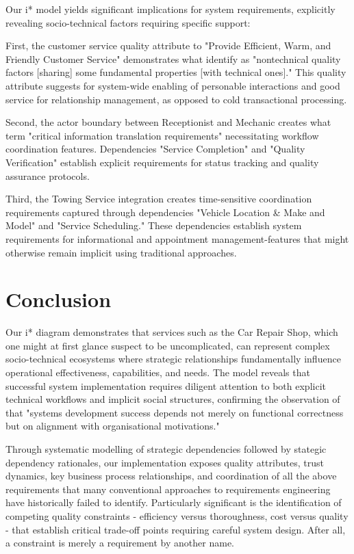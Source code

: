 \documentclass[14pt,a4paper]{article}
\begin{document}
Our i* model yields significant implications for system requirements, explicitly revealing socio-technical factors requiring specific support:

First, the customer service quality attribute to "Provide Efficient, Warm, and Friendly Customer Service" demonstrates what \textcite[p. 304]{Carvallo2006} identify as "nontechnical quality factors [sharing] some fundamental properties [with technical ones]." This quality attribute suggests for system-wide enabling of personable interactions and good service for relationship management, as opposed to cold transactional processing.

Second, the actor boundary between Receptionist and Mechanic creates what \textcite[p. 48]{Gorton2017} term "critical information translation requirements" necessitating workflow coordination features. Dependencies "Service Completion" and "Quality Verification" establish explicit requirements for status tracking and quality assurance protocols.

Third, the Towing Service integration creates time-sensitive coordination requirements captured through dependencies "Vehicle Location \& Make and Model" and "Service Scheduling." These dependencies establish system requirements for informational and appointment management-features that might otherwise remain implicit using traditional approaches.

\section{Conclusion}

Our i* diagram demonstrates that services such as the Car Repair Shop, which one might at first glance suspect to be uncomplicated, can represent complex socio-technical ecosystems where strategic relationships fundamentally influence operational effectiveness, capabilities, and needs. The model reveals that successful system implementation requires diligent attention to both explicit technical workflows and implicit social structures, confirming the observation of \textcite[p. 47]{Lezcano2022} that "systems development success depends not merely on functional correctness but on alignment with organisational motivations."

Through systematic modelling of strategic dependencies followed by stategic dependency rationales, our implementation exposes quality attributes, trust dynamics, key business process relationships, and coordination of all the above requirements that many conventional approaches to requirements engineering have historically failed to identify. Particularly significant is the identification of competing quality constraints - efficiency versus thoroughness, cost versus quality - that establish critical trade-off points requiring careful system design. After all, a constraint is merely a requirement by another name.
\end{document}
